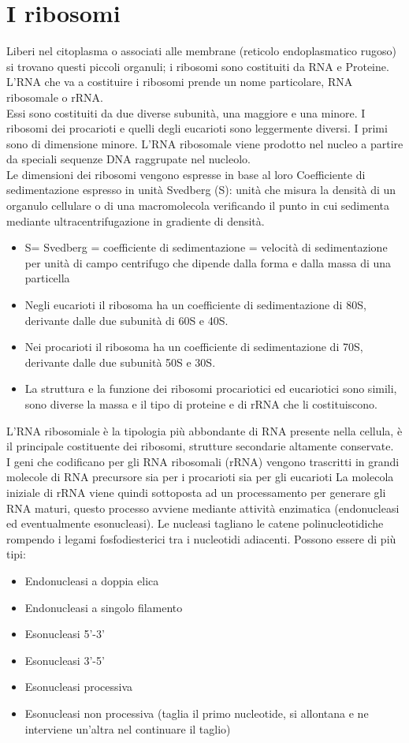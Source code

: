 \documentclass{article}
\begin{document}
\section{I ribosomi}
Liberi nel citoplasma o associati alle membrane (reticolo endoplasmatico rugoso) si trovano questi piccoli organuli; i ribosomi sono costituiti da RNA e Proteine. L'RNA 
che va a costituire i ribosomi prende un nome particolare, RNA ribosomale o rRNA.\\
Essi sono costituiti da due diverse subunità, una maggiore e una minore. I ribosomi dei procarioti e quelli degli eucarioti sono leggermente diversi. I primi sono di dimensione minore.
L'RNA ribosomale viene prodotto nel nucleo a partire da speciali sequenze DNA raggrupate nel nucleolo.\\
Le dimensioni dei ribosomi vengono espresse in base al loro
Coefficiente di sedimentazione espresso in unità Svedberg (S):
unità che misura la densità di un organulo cellulare o di una
macromolecola verificando il punto in cui sedimenta mediante
ultracentrifugazione in gradiente di densità.\\
\begin{itemize}
    \item S= Svedberg = coefficiente di sedimentazione = velocità di sedimentazione per unità di campo centrifugo
    che dipende dalla forma e dalla massa di una particella
    \item Negli eucarioti il ribosoma ha un coefficiente di sedimentazione di 80S, derivante dalle due subunità di
    60S e 40S.
    \item Nei procarioti il ribosoma ha un coefficiente di sedimentazione di 70S, derivante dalle due subunità 50S e
    30S.
    \item La struttura e la funzione dei ribosomi procariotici ed eucariotici sono simili, sono diverse la massa e il tipo
    di proteine e di rRNA che li costituiscono.
\end{itemize}
L'RNA ribosomiale è la tipologia più abbondante di RNA presente nella cellula, è il principale costituente dei ribosomi, strutture secondarie 
altamente conservate.\\
I geni che codificano per gli RNA ribosomali (rRNA) vengono trascritti in grandi molecole di RNA precursore
sia per i procarioti sia per gli eucarioti
La molecola iniziale di rRNA viene quindi sottoposta ad un processamento per generare gli RNA maturi, questo processo avviene mediante attività enzimatica 
(endonucleasi ed eventualmente esonucleasi). Le nucleasi tagliano le catene polinucleotidiche rompendo i legami fosfodiesterici tra i nucleotidi adiacenti.
Possono essere di più tipi:
\begin{itemize}
    \item Endonucleasi a doppia elica
    \item Endonucleasi a singolo filamento
    \item Esonucleasi 5'-3'
    \item Esonucleasi 3'-5'
    \item Esonucleasi processiva
    \item Esonucleasi non processiva
    \subitem (taglia il primo nucleotide,
    si allontana e ne interviene
    un'altra nel continuare il
    taglio)
\end{itemize}
\end{document}
